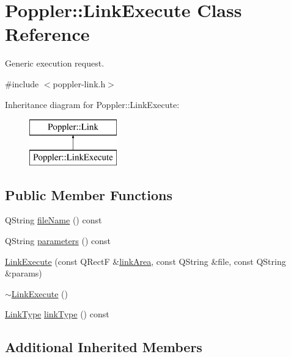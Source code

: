 \hypertarget{class_poppler_1_1_link_execute}{}\section{Poppler\+:\+:Link\+Execute Class Reference}
\label{class_poppler_1_1_link_execute}


Generic execution request.  




{\ttfamily \#include $<$poppler-\/link.\+h$>$}

Inheritance diagram for Poppler\+:\+:Link\+Execute\+:\begin{figure}[H]
\begin{center}
\leavevmode
\includegraphics[height=2.000000cm]{class_poppler_1_1_link_execute}
\end{center}
\end{figure}
\subsection*{Public Member Functions}
\begin{DoxyCompactItemize}
\item 
Q\+String \hyperlink{class_poppler_1_1_link_execute_a8943aa246d15145378f04f7e75f1fc02}{file\+Name} () const
\item 
Q\+String \hyperlink{class_poppler_1_1_link_execute_a1da68fd8e38290ab1a4d58a5358f3ecf}{parameters} () const
\item 
\hyperlink{class_poppler_1_1_link_execute_a9902d58708347be48688a0663fb6a717}{Link\+Execute} (const Q\+RectF \&\hyperlink{class_poppler_1_1_link_adb525b65cfac39dcdba3f59faa57a0bf}{link\+Area}, const Q\+String \&file, const Q\+String \&params)
\item 
\hyperlink{class_poppler_1_1_link_execute_ac0071741036aad003dc6edce965d1b82}{$\sim$\+Link\+Execute} ()
\item 
\hyperlink{class_poppler_1_1_link_af0dacfa77a548bb043dbae4bb9dc6c1e}{Link\+Type} \hyperlink{class_poppler_1_1_link_execute_a77c65404c0d2e96604f4db64f7a09605}{link\+Type} () const
\end{DoxyCompactItemize}
\subsection*{Additional Inherited Members}



